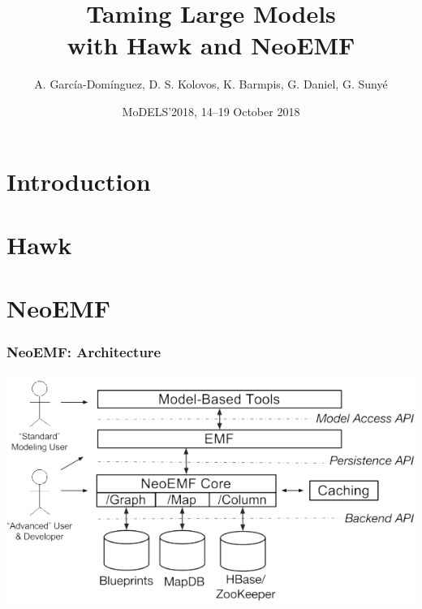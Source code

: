 \documentclass[10pt]{beamer}
\title{Taming Large Models\\with Hawk and NeoEMF}
\date{MoDELS'2018, 14--19 October 2018}
\author{A. García-Domínguez, D. S. Kolovos, K. Barmpis, G. Daniel, G. Sunyé}
\begin{document}
\maketitle

\section{Introduction}
\section{Hawk}

\section{NeoEMF}

\begin{frame}[t]\frametitle{NeoEMF: Architecture}
  \begin{center}
    \includegraphics[width=\textwidth]{neoemf-architecture.png}
  \end{center}
\end{frame}
\end{document}
